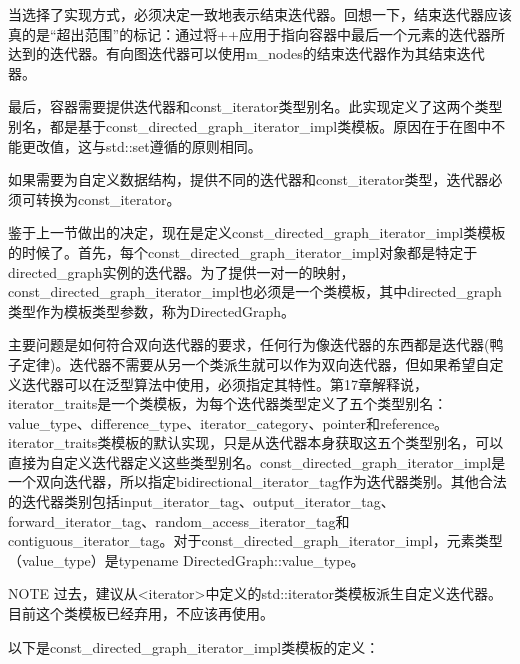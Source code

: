 当选择了实现方式，必须决定一致地表示结束迭代器。回想一下，结束迭代器应该真的是“超出范围”的标记：通过将++应用于指向容器中最后一个元素的迭代器所达到的迭代器。有向图迭代器可以使用m\_nodes的结束迭代器作为其结束迭代器。

最后，容器需要提供迭代器和const\_iterator类型别名。此实现定义了这两个类型别名，都是基于const\_directed\_graph\_iterator\_impl类模板。原因在于在图中不能更改值，这与std::set遵循的原则相同。

如果需要为自定义数据结构，提供不同的迭代器和const\_iterator类型，迭代器必须可转换为const\_iterator。


鉴于上一节做出的决定，现在是定义const\_directed\_graph\_iterator\_impl类模板的时候了。首先，每个const\_directed\_graph\_iterator\_impl对象都是特定于directed\_graph实例的迭代器。为了提供一对一的映射，const\_directed\_graph\_iterator\_impl也必须是一个类模板，其中directed\_graph类型作为模板类型参数，称为DirectedGraph。

主要问题是如何符合双向迭代器的要求，任何行为像迭代器的东西都是迭代器(鸭子定律)。迭代器不需要从另一个类派生就可以作为双向迭代器，但如果希望自定义迭代器可以在泛型算法中使用，必须指定其特性。第17章解释说，iterator\_traits是一个类模板，为每个迭代器类型定义了五个类型别名：value\_type、difference\_type、iterator\_category、pointer和reference。iterator\_traits类模板的默认实现，只是从迭代器本身获取这五个类型别名，可以直接为自定义迭代器定义这些类型别名。const\_directed\_graph\_iterator\_impl是一个双向迭代器，所以指定bidirectional\_iterator\_tag作为迭代器类别。其他合法的迭代器类别包括input\_iterator\_tag、output\_iterator\_tag、forward\_iterator\_tag、random\_access\_iterator\_tag和contiguous\_iterator\_tag。对于const\_directed\_graph\_iterator\_impl，元素类型（value\_type）是typename DirectedGraph::value\_type。

\begin{myNotic}{NOTE}
过去，建议从<iterator>中定义的std::iterator类模板派生自定义迭代器。目前这个类模板已经弃用，不应该再使用。
\end{myNotic}

以下是const\_directed\_graph\_iterator\_impl类模板的定义：

